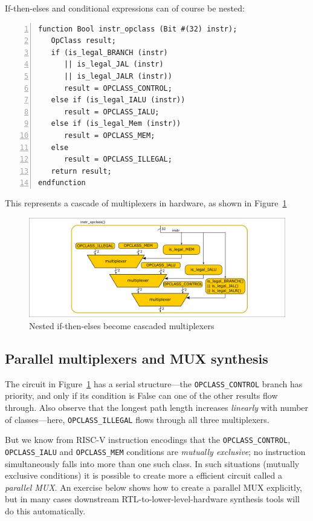 If-then-elses and conditional expressions can of course be nested:


\begin{Verbatim}[frame=single, numbers=left]
function Bool instr_opclass (Bit #(32) instr);
   OpClass result;
   if (is_legal_BRANCH (instr)
      || is_legal_JAL (instr)
      || is_legal_JALR (instr))
      result = OPCLASS_CONTROL;
   else if (is_legal_IALU (instr))
      result = OPCLASS_IALU;
   else if (is_legal_Mem (instr))
      result = OPCLASS_MEM;
   else
      result = OPCLASS_ILLEGAL;
   return result;
endfunction
\end{Verbatim}

This represents a cascade of multiplexers in hardware, as shown in
Figure~\ref{Fig_Combo_Multiplexer_Cascade}
\begin{figure}[htbp]
  \centerline{\includegraphics[width=6in,angle=0]{ch040_Combo_Circuits/Figures/Fig_Combo_Multiplexer_Cascade}}
  \caption{\label{Fig_Combo_Multiplexer_Cascade}Nested if-then-elses become cascaded multiplexers}
\end{figure}


\subsection{Parallel multiplexers and MUX synthesis}


The circuit in Figure~\ref{Fig_Combo_Multiplexer_Cascade} has a
serial structure---the \verb|OPCLASS_CONTROL| branch has priority, and
only if its condition is False can one of the other results flow
through.  Also observe that the longest path length increases
\emph{linearly} with number of classes---here, \verb|OPCLASS_ILLEGAL|
flows through all three multiplexers.

But we know from RISC-V instruction encodings that the
\verb|OPCLASS_CONTROL|, \verb|OPCLASS_IALU| and \verb|OPCLASS_MEM|
conditions are \emph{mutually exclusive}; no instruction
simultaneously falls into more than one such class.  In such
situations (mutually exclusive conditions) it is possible to create
more a efficient circuit called a \emph{parallel MUX}.  An exercise
below shows how to create a parallel MUX explicitly, but in many cases
downstream RTL-to-lower-level-hardware synthesis tools will do this
automatically.

